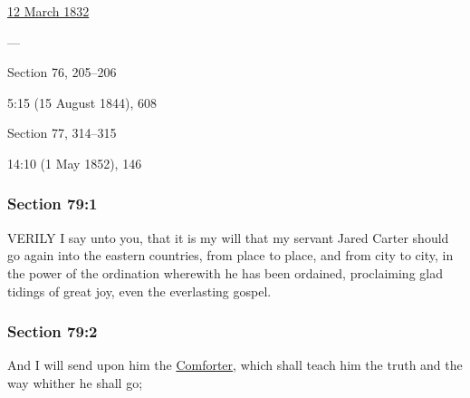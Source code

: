 		\begin{compactdesc}
			\item[JSP] \hyperref[EMS-1832-JS-12-MAR-1832]{12 March 1832}
			\item[BC] ---
			\item[DC 1835] Section 76, 205--206
			\item[TS] 5:15 (15 August 1844), 608
			\item[DC 1844] Section 77, 314--315
			\item[MS] 14:10 (1 May 1852), 146
		\end{compactdesc}

	\subsubsection{Section 79:1} %
		\label{DC79-1}

		VERILY I say unto you, that it is my will that my servant Jared Carter should go again into the eastern countries, from place to place, and from city to city, in the power of the ordination wherewith he has been ordained, proclaiming glad tidings of great joy, even the everlasting gospel.


	\subsubsection{Section 79:2} %
		\label{DC79-2}

		And I will send upon him the \hyperref[COMFORTER]{Comforter}, which shall teach him the truth and the way whither he shall go;


